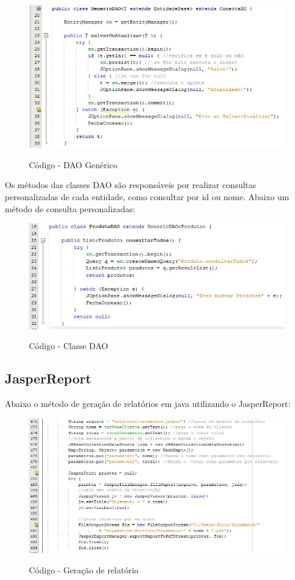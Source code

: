   
 \begin{figure}[H]
\centering
\caption{Código - DAO Genérico}
\includegraphics[width=12cm]{imagens/codigo/TrechoGenericDao}
\label{fig:Dao Genérico}
\end{figure}
   
   Os métodos das classes DAO são responsáveis por realizar consultas personalizadas de cada entidade, como consultar por id ou nome. Abaixo um método de consulta personalizadas:
   
 \begin{figure}[H]
\centering
\caption{Código - Classe DAO}
\includegraphics[width=13cm]{imagens/codigo/TrechoDao}
\label{fig:Classe DAO}
\end{figure}
    
    \subsection{JasperReport}
    Abaixo o método de geração de relatórios em java utilizando o JasperReport:
    
\begin{figure}[h]
\centering
\caption{Código - Geração de relatório}
\includegraphics[width=15cm]{imagens/codigo/TrechoJasper}
\label{fig:Método Relatório}
\end{figure}
    
